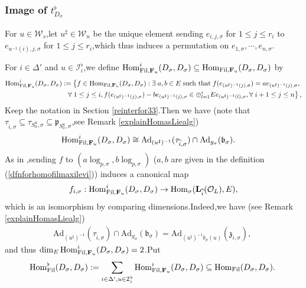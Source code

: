 \documentclass[10pt]{article}
\newcommand{\fil}{{\rm Fil}}
\newcommand{\homo}{{\rm Hom}}
\newcommand{\bF}{{\mathbf{F}}}
\newcommand{\bL}{{\mathbf{L}}}
\newcommand{\cI}{\mathcal I}
\newcommand{\cO}{\mathcal O}
\newcommand{\fb}{{\mathfrak{b}}}
\newcommand{\fp}{{\mathfrak{p}}}
\newcommand{\fz}{{\mathfrak{z}}}
\newcommand{\sW}{\mathscr W}
\begin{document}
\subsubsection{Image of $t^{\flat}_{D_{\sigma}}$}

For  $u\in \sW_s$,\;let $u^{\sharp}\in \sW_n$ be the unique element sending $e_{i,j,\sigma}$ for $1\leq j\leq r_i$ to $e_{u^{-1}(i),j,\sigma}$ for $1\leq j\leq r_i$,\;which thus induces a permutation on $e_{1,\sigma},\cdots,e_{n,\sigma}$.\;


For $i\in \Delta'$ and $u\in \cI_{i}^{\flat}$,\;we  define $\homo_{\fil,\bF_u}^i(D_{\sigma},D_{\sigma})\subseteq \homo_{\fil,\bF_u}(D_{\sigma},D_{\sigma})$ by
\begin{equation}\label{dfnforhomofilmaxilevi}
	\begin{aligned}
		\homo_{\fil,\bF_u}^i(D_{\sigma},D_{\sigma}):=\left\{f\in \homo_{\fil,\bF_u}(D_{\sigma},D_{\sigma}):\exists\;a,b\in E\; \text{such that\;} f(e_{(u^{\sharp})^{-1}(j),\sigma})=ae_{(u^{\sharp})^{-1}(j),\sigma},\right.\\ \left. \forall\;1\leq j\leq i,f(e_{(u^{\sharp})^{-1}(j),\sigma})-be_{(u^{\sharp})^{-1}(j),\sigma}\in \oplus_{l=1}^{i}Ee_{(u^{\sharp})^{-1}(l),\sigma},\forall\;i+1\leq j\leq n\right\},
	\end{aligned}
\end{equation}
Keep the notation in Section \ref{reinterfor33}.\;Then we have (note that $\tau_{\widehat{i},\sigma}\subseteq \tau_{S_0^u,\sigma}\subseteq \fp_{S^u_0,\sigma}$,\;see Remark \ref{explainHomasLiealg})
\begin{equation}
	\begin{aligned}
		&\homo^i_{\fil,\bF_u}(D_{\sigma},D_{\sigma})\cong \mathrm{Ad}_{(u^{\sharp})^{-1}}(\tau_{\widehat{i},\sigma})\cap \mathrm{Ad}_{g_{\sigma}}(\fb_{\sigma}).\;
	\end{aligned}
\end{equation}
As in \cite[(134) \& (137)]{BDcritical25},\;sending $f$ to $(a\log_{p,\sigma},b\log_{p,\sigma})$ ($a,b$ are given in the definition (\ref{dfnforhomofilmaxilevi})) induces a canonical map 
\[f_{i,\sigma}:\homo^i_{\fil,\bF_u}(D_{\sigma},D_{\sigma})\rightarrow \homo_{\sigma}(\bL_{\widehat{i}}(\cO_L),E),\]
which is an isomorphism by comparing dimensions.\;Indeed,\;we have (see Remark \ref{explainHomasLiealg})
\begin{equation}
	\begin{aligned}
		\mathrm{Ad}_{(u^{\sharp})^{-1}}(\tau_{\widehat{i},\sigma})\cap \mathrm{Ad}_{g_{\sigma}}(\fb_{\sigma})=\mathrm{Ad}_{(u^{\sharp})^{-1}b_{\sigma}(u)}(\fz_{\widehat{i},\sigma}),\;
	\end{aligned}
\end{equation}
and thus $\dim_E\homo^i_{\fil,\bF_u}(D_{\sigma},D_{\sigma})=2$.\;Put
\begin{equation}\label{dfnforhomoflat}
	\homo^{\flat}_{\fil}(D_{\sigma},D_{\sigma}):=\sum_{i\in\Delta',u\in \cI_{i}^{\flat}}\homo^i_{\fil,\bF_u}(D_{\sigma},D_{\sigma})\subseteq\homo_{\fil}(D_{\sigma},D_{\sigma}).\;
\end{equation}
\end{document}
